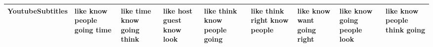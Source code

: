 \documentclass[11pt,a4paper]{article}
\begin{document}
\begin{appendices}
\begin{table}[htb]
\begin{tiny}
\begin{tabular}{|p{}|p{}|p{}|p{}|p{}|p{}|p{}|p{}|p{}|}
    YoutubeSubtitles & like \newline know \newline people \newline going \newline time & like \newline time \newline know \newline going \newline think & like \newline host \newline guest \newline know \newline look & like \newline think \newline know \newline people \newline going & like \newline think \newline right \newline know \newline people & like \newline know \newline want \newline going \newline right & like \newline know \newline going \newline people \newline look & like \newline know \newline people \newline think \newline going\\\hline

\end{tabular}
\end{tiny}
\end{table}
\end{appendices}
\end{document}
